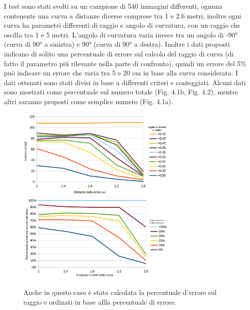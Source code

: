     I test sono stati svolti su un campione di 540 immagini differenti, ognuna contenente una curva a distanze diverse comprese tra 1 e 2.6 metri, inoltre ogni curva ha parametri differenti di raggio e angolo di curvatura, con un raggio che oscilla tra 1 e 5 metri. L'angolo di curvatura varia invece tra un angolo di -90° (curva di 90° a sinistra) e 90° (curva di 90° a destra). Inoltre i dati proposti indicano di solito una percentuale di errore sul calcolo del raggio di curva (di fatto il parametro più rilevante nella parte di confronto), quindi un errore del 5\% può indicare un errore che varia tra 5 e 20 cm in base alla curva considerata.
    I dati ottenuti sono stati divisi in base a differenti criteri e conteggiati. Alcuni dati sono mostrati come percentuale sul numero totale (Fig. 4.1b, Fig. 4.2), mentre altri saranno proposti come semplice numero (Fig. 4.1a).

    \begin{figure}[!ht]
        \centering
        \includegraphics[width=0.7\textwidth]{img/graphradius}
        \includegraphics[width=0.7\textwidth]{img/graphdistance}
        \caption[Grafico sulla percentuale di errore in relazione alla distanza dalla curva]{Anche in questo caso è stata calcolata la percentuale d'errore sul raggio e ordinati in base allla percentuale di errore.}
    \end{figure}

